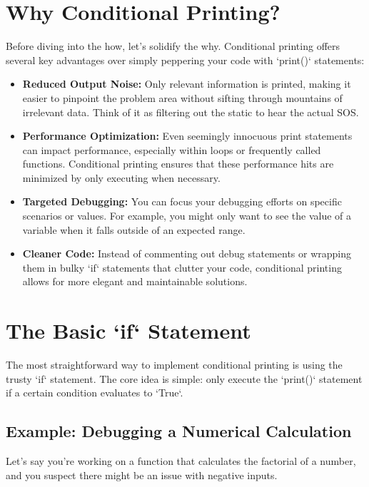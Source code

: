 \documentclass{article}
\begin{document}
\section*{Why Conditional Printing?}

Before diving into the how, let's solidify the why.  Conditional printing offers several key advantages over simply peppering your code with `print()` statements:

\begin{itemize}
    \item \textbf{Reduced Output Noise:}  Only relevant information is printed, making it easier to pinpoint the problem area without sifting through mountains of irrelevant data.  Think of it as filtering out the static to hear the actual SOS.
    \item \textbf{Performance Optimization:}  Even seemingly innocuous print statements can impact performance, especially within loops or frequently called functions. Conditional printing ensures that these performance hits are minimized by only executing when necessary.
    \item \textbf{Targeted Debugging:}  You can focus your debugging efforts on specific scenarios or values.  For example, you might only want to see the value of a variable when it falls outside of an expected range.
    \item \textbf{Cleaner Code:}  Instead of commenting out debug statements or wrapping them in bulky `if` statements that clutter your code, conditional printing allows for more elegant and maintainable solutions.
\end{itemize}

\section*{The Basic `if` Statement}

The most straightforward way to implement conditional printing is using the trusty `if` statement.  The core idea is simple: only execute the `print()` statement if a certain condition evaluates to `True`.

\subsection*{Example: Debugging a Numerical Calculation}

Let's say you're working on a function that calculates the factorial of a number, and you suspect there might be an issue with negative inputs.
\end{document}
